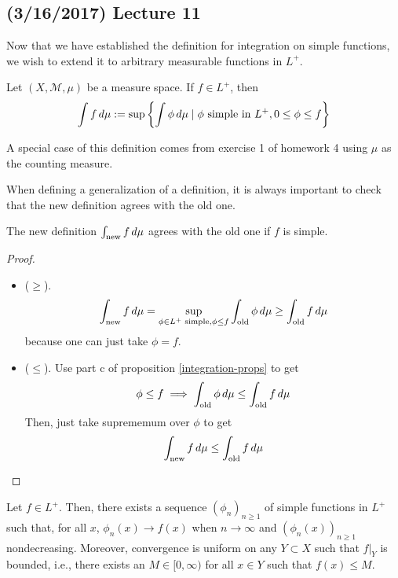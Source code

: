 \documentclass[11pt,leqno,oneside]{amsbook}
\numberwithin{thm}{section}
\newcommand{\M}{\mathcal{M}} %
\begin{document}
\subsection*{(3/16/2017) Lecture 11}
Now that we have established the definition for integration on simple
functions, we wish to extend it to arbitrary measurable functions in \(L^+\).
\begin{defn}
  Let $(X,\M,\mu)$ be a measure space. If $f \in L^+$, then \[
    \int f \, d\mu := \sup \left\{ \int \phi \, d\mu \mid \phi \text{ simple
        in } L^+, 0 \leq \phi \leq f \right\}
  \]
\end{defn}
\begin{example}
  A special case of this definition comes from exercise 1 of homework
  4 using $\mu$ as the counting measure.
\end{example}
When defining a generalization of a definition, it is always important
to check that the new definition agrees with the old one.
\begin{prop}
  The new definition $\int_{\text{new}} f \, d\mu$  agrees with the old
  one if $f$ is simple.
\end{prop}
\begin{proof}
  \begin{itemize}
  \item ($\geq$). \[
      \int_{\text{new}} f \, d\mu = \sup_{\phi \in L^+ \text{ simple},
        \phi \leq f} \int_{\text{old}} \phi \, d\mu \geq
      \int_{\text{old}} f \, d\mu
    \]
    because one can just take $\phi = f$.
  \item ($\leq$). Use part c of proposition \ref{integration-props} to get \[
      \phi \leq f \implies \int_{\text{old}} \phi \, d\mu \leq
      \int_{\text{old}} f \, d\mu
    \]
    Then, just take suprememum over $\phi$ to get \[
      \int_{\text{new}} f \, d\mu \leq \int_{\text{old}} f \, d\mu
    \]
  \end{itemize}
\end{proof}
\begin{thm}
  Let $f \in L^+$. Then, there exists a sequence $(\phi_n)_{n \geq 1}$
  of simple functions in $L^+$ such that, for all $x$, $\phi_n(x) \to
  f(x)$ when $n \to \infty$ and $(\phi_n(x))_{n \geq 1}$
  nondecreasing. Moreover, convergence is uniform on any $Y \subset X$
  such that $f|_Y$ is bounded, i.e., there exists an $M \in
  [0,\infty)$ for all $x \in Y$ such that $f(x) \leq M$.
\end{thm}
\end{document}
